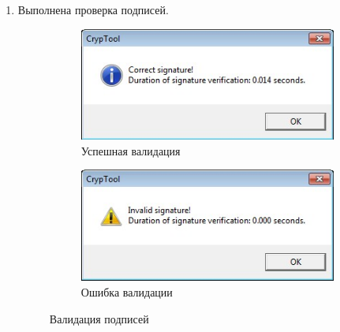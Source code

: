 \documentclass[a4paper, 14pt]{extarticle}
\begin{document}
\begin{enumerate}
        
        
        
    \item Выполнена проверка подписей.
        \begin{figure}[h]
            \centering
            \begin{subfigure}[b]{0.42\textwidth}
                \includegraphics[width=\textwidth]{img/S005.jpg}
                \caption{Успешная валидация}
            \end{subfigure}%
            \hspace{1cm}
            \begin{subfigure}[b]{0.42\textwidth}
                \includegraphics[width=\textwidth]{img/S006.jpg}
                \caption{Ошибка валидации}
            \end{subfigure}
            \caption{Валидация подписей}
        \end{figure}
        \FloatBarrier{}


\end{enumerate}
\end{document}
